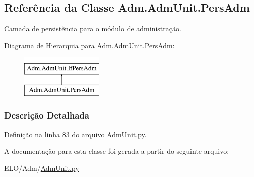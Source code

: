 \hypertarget{classAdm_1_1AdmUnit_1_1PersAdm}{\subsection{Referência da Classe Adm.\-Adm\-Unit.\-Pers\-Adm}
\label{classAdm_1_1AdmUnit_1_1PersAdm}
}


Camada de persistência para o módulo de administração.  


Diagrama de Hierarquia para Adm.\-Adm\-Unit.\-Pers\-Adm\-:\begin{figure}[H]
\begin{center}
\leavevmode
\includegraphics[height=2.000000cm]{dc/d1a/classAdm_1_1AdmUnit_1_1PersAdm}
\end{center}
\end{figure}


\subsubsection{Descrição Detalhada}


Definição na linha \hyperlink{AdmUnit_8py_source_l00083}{83} do arquivo \hyperlink{AdmUnit_8py_source}{Adm\-Unit.\-py}.



A documentação para esta classe foi gerada a partir do seguinte arquivo\-:\begin{DoxyCompactItemize}
\item 
E\-L\-O/\-Adm/\hyperlink{AdmUnit_8py}{Adm\-Unit.\-py}\end{DoxyCompactItemize}
